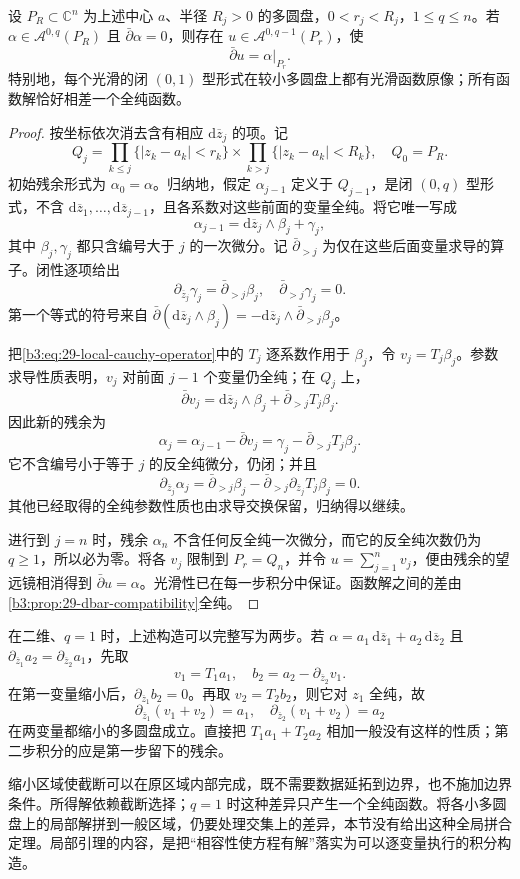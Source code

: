 \begin{theorem}\label{b3:thm:29-local-dbar}
设 \(P_R\subset\mathbb C^n\) 为上述中心 \(a\)、半径 \(R_j>0\) 的多圆盘，\(0<r_j<R_j\)，\(1\le q\le n\)。若 \(\alpha\in\mathcal A^{0,q}(P_R)\) 且 \(\bar\partial\alpha=0\)，则存在 \(u\in\mathcal A^{0,q-1}(P_r)\)，使
\[
 \bar\partial u=\alpha|_{P_r}.
\]
特别地，每个光滑的闭 \((0,1)\) 型形式在较小多圆盘上都有光滑函数原像；所有函数解恰好相差一个全纯函数。
\end{theorem}
\begin{proof}
按坐标依次消去含有相应 \(\mathrm d\overline z_j\) 的项。记
\[
 Q_j=\prod_{k\le j}\{|z_k-a_k|<r_k\}
       \times\prod_{k>j}\{|z_k-a_k|<R_k\},
 \quad Q_0=P_R.
\]
初始残余形式为 \(\alpha_0=\alpha\)。归纳地，假定 \(\alpha_{j-1}\) 定义于 \(Q_{j-1}\)，是闭 \((0,q)\) 型形式，不含 \(\mathrm d\overline z_1,\ldots,\mathrm d\overline z_{j-1}\)，且各系数对这些前面的变量全纯。将它唯一写成
\[
 \alpha_{j-1}=\mathrm d\overline z_j\wedge\beta_j+\gamma_j,
\]
其中 \(\beta_j,\gamma_j\) 都只含编号大于 \(j\) 的一次微分。记 \(\bar\partial_{>j}\) 为仅在这些后面变量求导的算子。闭性逐项给出
\[
 \partial_{\overline z_j}\gamma_j=\bar\partial_{>j}\beta_j,
 \quad \bar\partial_{>j}\gamma_j=0.
\]
第一个等式的符号来自
\(\bar\partial(\mathrm d\overline z_j\wedge\beta_j)
=-\mathrm d\overline z_j\wedge\bar\partial_{>j}\beta_j\)。

把\eqref{b3:eq:29-local-cauchy-operator}中的 \(T_j\) 逐系数作用于 \(\beta_j\)，令 \(v_j=T_j\beta_j\)。参数求导性质表明，\(v_j\) 对前面 \(j-1\) 个变量仍全纯；在 \(Q_j\) 上，
\[
 \bar\partial v_j
 =\mathrm d\overline z_j\wedge\beta_j+
   \bar\partial_{>j}T_j\beta_j.
\]
因此新的残余为
\[
 \alpha_j=\alpha_{j-1}-\bar\partial v_j
 =\gamma_j-\bar\partial_{>j}T_j\beta_j.
\]
它不含编号小于等于 \(j\) 的反全纯微分，仍闭；并且
\[
 \partial_{\overline z_j}\alpha_j
 =\bar\partial_{>j}\beta_j-
   \bar\partial_{>j}\partial_{\overline z_j}T_j\beta_j=0.
\]
其他已经取得的全纯参数性质也由求导交换保留，归纳得以继续。

进行到 \(j=n\) 时，残余 \(\alpha_n\) 不含任何反全纯一次微分，而它的反全纯次数仍为 \(q\ge1\)，所以必为零。将各 \(v_j\) 限制到 \(P_r=Q_n\)，并令 \(u=\sum_{j=1}^n v_j\)，便由残余的望远镜相消得到 \(\bar\partial u=\alpha\)。光滑性已在每一步积分中保证。函数解之间的差由\cref{b3:prop:29-dbar-compatibility}全纯。
\end{proof}

在二维、\(q=1\) 时，上述构造可以完整写为两步。若
\(\alpha=a_1\,\mathrm d\overline z_1+a_2\,\mathrm d\overline z_2\) 且
\(\partial_{\overline z_1}a_2=\partial_{\overline z_2}a_1\)，先取
\[
 v_1=T_1a_1,\quad
 b_2=a_2-\partial_{\overline z_2}v_1.
\]
在第一变量缩小后，\(\partial_{\overline z_1}b_2=0\)。再取 \(v_2=T_2b_2\)，则它对 \(z_1\) 全纯，故
\[
 \partial_{\overline z_1}(v_1+v_2)=a_1,\quad
 \partial_{\overline z_2}(v_1+v_2)=a_2
\]
在两变量都缩小的多圆盘成立。直接把 \(T_1a_1+T_2a_2\) 相加一般没有这样的性质；第二步积分的应是第一步留下的残余。

\ProseParagraphBreak

缩小区域使截断可以在原区域内部完成，既不需要数据延拓到边界，也不施加边界条件。所得解依赖截断选择；\(q=1\) 时这种差异只产生一个全纯函数。将各小多圆盘上的局部解拼到一般区域，仍要处理交集上的差异，本节没有给出这种全局拼合定理。局部引理的内容，是把“相容性使方程有解”落实为可以逐变量执行的积分构造。
